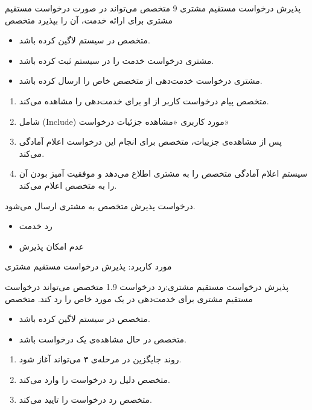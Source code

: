 {
	\usecase
	{پذیرش درخواست مستقیم مشتری}
	{9}
	{متخصص می‌تواند در صورت درخواست مستقیم مشتری برای ارائه خدمت، آن را بپذیرد}
	{متخصص}
	{}
	{	
		\begin{itemize}
			\vspace*{-0.6cm}
			\item 
			متخصص در سیستم لاگین کرده باشد.
			\item
			مشتری درخواست خدمت را در سیستم ثبت کرده باشد.
			\item
			مشتری درخواست خدمت‌دهی از متخصص خاص را ارسال کرده باشد.
		\end{itemize}
	}
	{ 
		\vspace*{-0.6cm}
		\begin{enumerate}
			\item
			متخصص پیام درخواست کاربر از او برای خدمت‌دهی را مشاهده می‌کند.
			\item 
			شامل (Include) مورد کاربری «مشاهده جزئیات درخواست»
			\item
			پس از مشاهده‌ی جزییات، متخصص برای انجام این درخواست اعلام آمادگی می‌کند.
			\item
			سیستم اعلام آمادگی متخصص را به مشتری اطلاع می‌دهد و موفقیت آمیز بودن آن را به متخصص اعلام می‌کند.
		\end{enumerate}
	}
	{درخواست پذیرش متخصص به مشتری ارسال می‌شود.}
	{
		\begin{itemize}
			\vspace*{-0.6cm}
			\item
			رد خدمت
			\item 
			 عدم امکان پذیرش
		\end{itemize}
	}
	{
		مورد کاربرد: پذیرش درخواست مستقیم مشتری
	}
	
	\alternativeflow
	{
		پذیرش درخواست مستقیم مشتری:رد درخواست
	}
	{1.9}
	{
		متخصص می‌تواند درخواست‌ مستقیم مشتری برای خدمت‌دهی در یک مورد خاص را رد کند.
	}
	{
		متخصص
	}
	{}
	{
		\begin{itemize}
			\vspace*{-0.6cm}
			\item 
			متخصص در سیستم لاگین کرده باشد.
			\item
			متخصص در حال مشاهده‌ی یک درخواست باشد.
		\end{itemize}
	}
	{
		\vspace*{-0.6cm}
		\begin{enumerate}
			\item 
			روند جایگزین در مرحله‌ی ۳ می‌تواند آغاز شود.
			\item
			متخصص دلیل رد درخواست را وارد می‌کند.
			\item
			متخصص رد درخواست را تایید می‌کند.
		

\end{enumerate}}}

